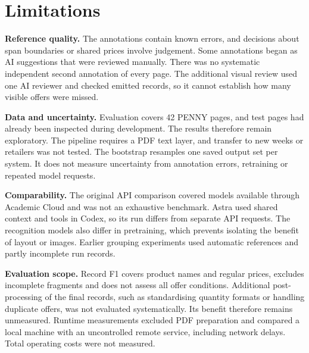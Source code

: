 \section{Limitations}\label{sec:limitations}
\textbf{Reference quality.} The annotations contain known errors, and decisions about span boundaries or shared prices involve judgement. Some annotations began as AI suggestions that were reviewed manually. There was no systematic independent second annotation of every page. The additional visual review used one AI reviewer and checked emitted records, so it cannot establish how many visible offers were missed.

\textbf{Data and uncertainty.} Evaluation covers 42 PENNY pages, and test pages had already been inspected during development. The results therefore remain exploratory. The pipeline requires a PDF text layer, and transfer to new weeks or retailers was not tested. The bootstrap resamples one saved output set per system. It does not measure uncertainty from annotation errors, retraining or repeated model requests.

\textbf{Comparability.} The original API comparison covered models available through Academic Cloud and was not an exhaustive benchmark. Astra used shared context and tools in Codex, so its run differs from separate API requests. The recognition models also differ in pretraining, which prevents isolating the benefit of layout or images. Earlier grouping experiments used automatic references and partly incomplete run records.

\textbf{Evaluation scope.} Record F1 covers product names and regular prices, excludes incomplete fragments and does not assess all offer conditions. Additional post-processing of the final records, such as standardising quantity formats or handling duplicate offers, was not evaluated systematically. Its benefit therefore remains unmeasured. Runtime measurements excluded PDF preparation and compared a local machine with an uncontrolled remote service, including network delays. Total operating costs were not measured.
